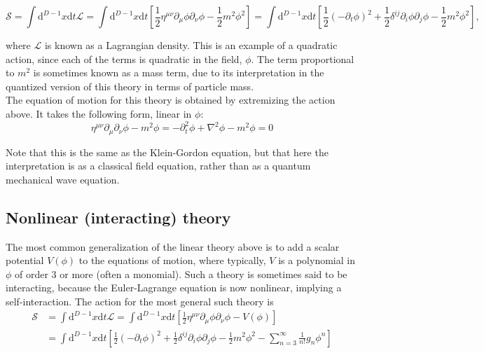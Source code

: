 \begin{equation}
    \mathcal{S}=\int \mathrm{d}^{D-1}x \mathrm{d}t \mathcal{L} = \int \mathrm{d}^{D-1}x \mathrm{d}t \left[ \frac{1}{2}\eta^{\mu\nu}\partial_\mu\phi\partial_\nu\phi -\frac{1}{2} m^2\phi^2 \right] 
    =\int \mathrm{d}^{D-1}x \mathrm{d}t \left[\frac{1}{2}( - \partial_t\phi)^2 + \frac{1}{2}\delta^{ij}\partial_i\phi \partial_j\phi -\frac{1}{2} m^2\phi^2 \right],
\end{equation}

where $\mathcal{L}$ is known as a Lagrangian density. This is an example of a quadratic action, since each of the terms is quadratic in the field, $\phi$. The term proportional to $m^2$ is sometimes known as a mass term, due to its interpretation in the quantized version of this theory in terms of particle mass.\\

The equation of motion for this theory is obtained by extremizing the action above. It takes the following form, linear in $\phi$:\\

\begin{equation}
    \eta^{\mu\nu}\partial_\mu\partial_\nu\phi-m^2\phi=-\partial^2_t\phi+\nabla^2\phi-m^2\phi=0
\end{equation}

Note that this is the same as the Klein-Gordon equation, but that here the interpretation is as a classical field equation, rather than as a quantum mechanical wave equation.\\

\subsection{Nonlinear (interacting) theory}

The most common generalization of the linear theory above is to add a scalar potential $V(\phi)$ to the equations of motion, where typically, $V$ is a polynomial in $\phi$ of order 3 or more (often a monomial). Such a theory is sometimes said to be interacting, because the Euler-Lagrange equation is now nonlinear, implying a self-interaction. The action for the most general such theory is\\

\begin{align}
    \mathcal{S}&=\int \mathrm{d}^{D-1}x \mathrm{d}t \mathcal{L} = \int \mathrm{d}^{D-1}x \mathrm{d}t \left[\frac{1}{2}\eta^{\mu\nu}\partial_\mu\phi\partial_\nu\phi - V(\phi) \right] \nonumber \\
    &=\int \mathrm{d}^{D-1}x \mathrm{d}t \left[\frac{1}{2}(- \partial_t\phi)^2 + \frac{1}{2}\delta^{ij}\partial_i\phi\partial_j\phi - \frac{1}{2}m^2\phi^2-\sum_{n=3}^\infty \frac{1}{n!} g_n\phi^n \right]
\end{align}

